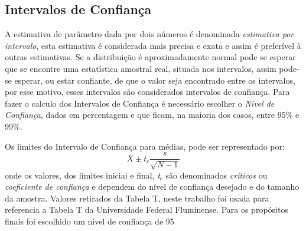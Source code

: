 \subsection{Intervalos de Confiança}

A estimativa de parâmetro dada por dois números é denominada \textit{estimativa por intervalo}, esta estimativa é considerada mais precisa e exata e assim é preferível à outras estimativas. Se a distribuição é aproximadamente normal pode se esperar que se encontre uma estatística amostral real, situada nos intervalos, assim pode-se esperar, ou estar confiante, de que o valor seja encontrado entre os intervalos, por esse motivo, esses intervalos são considerados intervalos de confiança. Para fazer o calculo dos Intervalos de Confiança é necessário escolher o \textit{Nível de Confiança}, dados em percentagem e que ficam, na maioria dos casos, entre 95\% e 99\%.

Os limites do Intervalo de Confiança para médias, pode ser representado por:
\begin{displaymath}
\bar{X}  \pm \mathit{t}_{\mathit{c}}\frac{\mathit{s}}{{\sqrt{N-1}}}
\end{displaymath}
onde os valores, dos limites iniciai e final, \textit{t$_c$} são denominados \textit{críticos} ou \textit{coeficiente de confiança} e dependem do nível de confiança desejado e do tamanho da amostra. Valores retirados da Tabela T, neste trabalho foi usada para referencia a Tabela T da Universidade Federal Fluminense\cite{TabelaUFF}. Para os propósitos finais foi escolhido um nível de confiança de 95%

